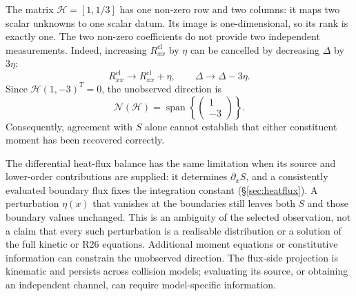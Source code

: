 \documentclass[lineno,paper]{JFM-FLM_Au}
\newenvironment{revision}{\begingroup\colorlet{shadecolor}{revisionyellow}\begin{shaded}}{\end{shaded}\endgroup}
\newenvironment{revision}{}{}
\newcommand{\cl}{\mathrm{cl}}
\begin{document}
\begin{revision}
The matrix $\mathcal H=[1,1/3]$ has one non-zero row and two columns: it maps two scalar unknowns to one scalar datum. Its image is one-dimensional, so its rank is exactly one. The two non-zero coefficients do not provide two independent measurements. Indeed, increasing $R^{\cl}_{xx}$ by $\eta$ can be cancelled by decreasing $\Delta$ by $3\eta$:
\begin{equation}
  R^{\cl}_{xx}\rightarrow R^{\cl}_{xx}+\eta,\qquad
  \Delta\rightarrow\Delta-3\eta .
  \label{eq:null_transform}
\end{equation}
Since $\mathcal H(1,-3)^T=0$, the unobserved direction is
\begin{equation}
  \mathcal N(\mathcal H)=\operatorname{span}\left\{\begin{pmatrix}1\\ -3\end{pmatrix}\right\} .
  \label{eq:nullspace}
\end{equation}
Consequently, agreement with $S$ alone cannot establish that either constituent moment has been recovered correctly.

The differential heat-flux balance has the same limitation when its source and lower-order contributions are supplied: it determines $\partial_x S$, and a consistently evaluated boundary flux fixes the integration constant (\S\ref{sec:heatflux}). A perturbation $\eta(x)$ that vanishes at the boundaries still leaves both $S$ and those boundary values unchanged. This is an ambiguity of the selected observation, not a claim that every such perturbation is a realisable distribution or a solution of the full kinetic or R26 equations. Additional moment equations or constitutive information can constrain the unobserved direction. The flux-side projection is kinematic and persists across collision models; evaluating its source, or obtaining an independent channel, can require model-specific information.
\end{revision}
\end{document}
